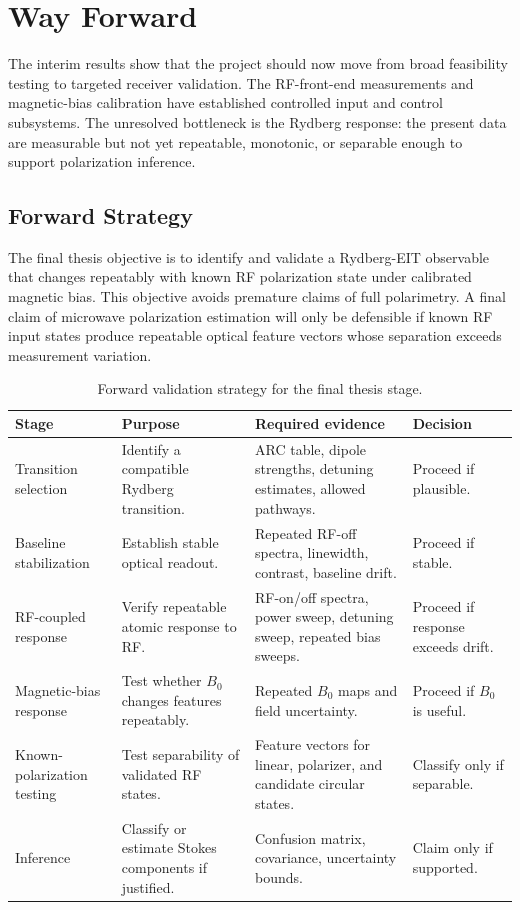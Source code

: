 \documentclass{ieeeaccess}
\begin{document}
\section{Way Forward}
\label{sec:way_forward}

The interim results show that the project should now move from broad feasibility testing to targeted receiver validation. The RF-front-end measurements and magnetic-bias calibration have established controlled input and control subsystems. The unresolved bottleneck is the Rydberg response: the present data are measurable but not yet repeatable, monotonic, or separable enough to support polarization inference.

\subsection{Forward Strategy}
\label{subsec:way_forward_strategy}

The final thesis objective is to identify and validate a Rydberg-EIT observable that changes repeatably with known RF polarization state under calibrated magnetic bias. This objective avoids premature claims of full polarimetry. A final claim of microwave polarization estimation will only be defensible if known RF input states produce repeatable optical feature vectors whose separation exceeds measurement variation.

\begin{table}[!t]
\caption{Forward validation strategy for the final thesis stage.}
\label{tab:way_forward_strategy}
\centering
\renewcommand{\arraystretch}{1.10}
\scriptsize
\begin{tabular}{p{} p{} p{} p{}}
\hline
\textbf{Stage} & \textbf{Purpose} & \textbf{Required evidence} & \textbf{Decision} \\
\hline
Transition selection & Identify a compatible Rydberg transition. & ARC table, dipole strengths, detuning estimates, allowed pathways. & Proceed if plausible. \\
Baseline stabilization & Establish stable optical readout. & Repeated RF-off spectra, linewidth, contrast, baseline drift. & Proceed if stable. \\
RF-coupled response & Verify repeatable atomic response to RF. & RF-on/off spectra, power sweep, detuning sweep, repeated bias sweeps. & Proceed if response exceeds drift. \\
Magnetic-bias response & Test whether \(B_0\) changes features repeatably. & Repeated \(B_0\) maps and field uncertainty. & Proceed if \(B_0\) is useful. \\
Known-polarization testing & Test separability of validated RF states. & Feature vectors for linear, polarizer, and candidate circular states. & Classify only if separable. \\
Inference & Classify or estimate Stokes components if justified. & Confusion matrix, covariance, uncertainty bounds. & Claim only if supported. \\
\hline
\end{tabular}
\end{table}
\end{document}
